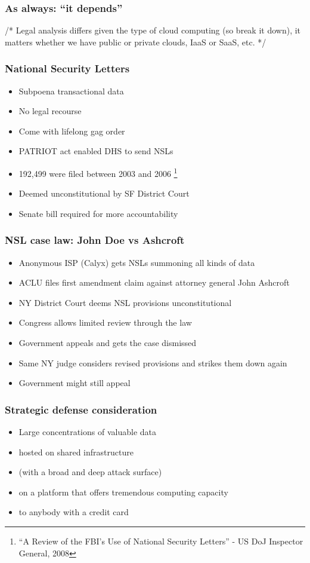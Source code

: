 \documentclass{beamer}
\begin{document}
\begin{frame}
    \frametitle{As always: ``it depends''}
    /* Legal analysis differs given the type of cloud computing (so break it
    down), it matters whether we have public or private clouds, IaaS or SaaS,
    etc. */
\end{frame}

\begin{frame}
    \frametitle{National Security Letters}
    \begin{itemize}
    \item Subpoena transactional data
    \item No legal recourse
    \item Come with lifelong gag order
    \item PATRIOT act enabled DHS to send NSLs
    \item 192,499 were filed between 2003 and 2006 \footnote{``A Review of the FBI's Use of National Security Letters'' - US DoJ Inspector General, 2008}
    \item Deemed unconstitutional by SF District Court
    \item Senate bill required for more accountability
    \end{itemize}
\end{frame}

\begin{frame}
    \frametitle{NSL case law: John Doe vs Ashcroft}
    \begin{itemize}
    \item Anonymous ISP (Calyx) gets NSLs summoning all kinds of data
    \item ACLU files first amendment claim against attorney general John Ashcroft
    \item NY District Court deems NSL provisions unconstitutional
    \item Congress allows limited review through the law
    \item Government appeals and gets the case dismissed
    \item Same NY judge considers revised provisions and strikes them down again
    \item Government might still appeal
    \end{itemize}
\end{frame}

\begin{frame}
    \frametitle{Strategic defense consideration}
    \begin{itemize}
      \item Large concentrations of valuable data
      \item hosted on shared infrastructure
      \item (with a broad and deep attack surface)
      \item on a platform that offers tremendous computing capacity
      \item to anybody with a credit card
    \end{itemize}
\end{frame}
\end{document}
